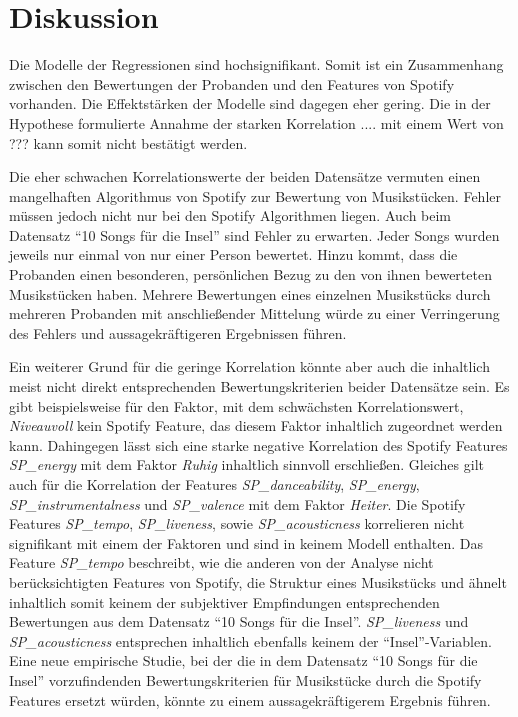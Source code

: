 \section*{Diskussion}
\label{sec:Diskussion}


Die Modelle der Regressionen sind hochsignifikant.
Somit ist ein Zusammenhang zwischen den Bewertungen der Probanden und den Features von Spotify vorhanden.
Die Effektstärken der Modelle sind dagegen eher gering.
Die in der Hypothese formulierte Annahme der starken Korrelation .... mit einem Wert von ??? kann somit nicht bestätigt werden.

Die eher schwachen Korrelationswerte der beiden Datensätze vermuten einen mangelhaften Algorithmus von Spotify zur Bewertung von Musikstücken.
Fehler müssen jedoch nicht nur bei den Spotify Algorithmen liegen.
Auch beim Datensatz ``10 Songs für die Insel'' sind Fehler zu erwarten.
Jeder Songs wurden jeweils nur einmal von nur einer Person bewertet.
Hinzu kommt, dass die Probanden einen besonderen, persönlichen Bezug zu den von ihnen bewerteten Musikstücken haben.
Mehrere Bewertungen eines einzelnen Musikstücks durch mehreren Probanden mit anschließender Mittelung würde zu einer Verringerung des Fehlers und aussagekräftigeren Ergebnissen führen.

Ein weiterer Grund für die geringe Korrelation könnte aber auch die inhaltlich meist nicht direkt entsprechenden Bewertungskriterien beider Datensätze sein.
Es gibt beispielsweise für den Faktor, mit dem schwächsten Korrelationswert, \textit{Niveauvoll} kein Spotify Feature, das diesem Faktor inhaltlich zugeordnet werden kann.
Dahingegen lässt sich eine starke negative Korrelation des Spotify Features \textit{SP\_energy} mit dem Faktor \textit{Ruhig} inhaltlich sinnvoll erschließen.
Gleiches gilt auch für die Korrelation der Features \textit{SP\_danceability}, \textit{SP\_energy}, \textit{SP\_instrumentalness} und \textit{SP\_valence} mit dem Faktor \textit{Heiter}.
Die Spotify Features \textit{SP\_tempo}, \textit{SP\_liveness}, sowie \textit{SP\_acousticness} korrelieren nicht signifikant mit einem der Faktoren und sind in keinem Modell enthalten. 
Das Feature \textit{SP\_tempo} beschreibt, wie die anderen  von der Analyse nicht berücksichtigten Features von Spotify, die Struktur eines Musikstücks und ähnelt inhaltlich somit keinem der subjektiver Empfindungen entsprechenden Bewertungen aus dem Datensatz ``10 Songs für die Insel''.
\textit{SP\_liveness} und \textit{SP\_acousticness} entsprechen inhaltlich ebenfalls keinem der ``Insel''-Variablen.  
Eine neue empirische Studie, bei der die in dem Datensatz ``10 Songs für die Insel'' vorzufindenden Bewertungskriterien für Musikstücke durch die Spotify Features ersetzt würden, könnte zu einem aussagekräftigerem Ergebnis führen.



